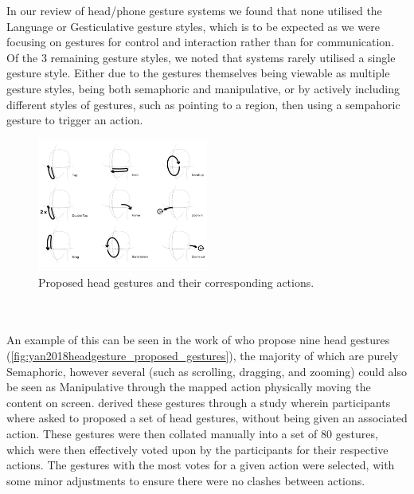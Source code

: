 In our review of head/phone gesture systems we found that none utilised the Language or Gesticulative gesture styles, which is to be expected as we were focusing on gestures for control and interaction rather than for communication.
Of the 3 remaining gesture styles, we noted that systems rarely utilised a single gesture style. Either due to the gestures themselves being viewable as multiple gesture styles, being both semaphoric and manipulative, or by actively including different styles of gestures, such as pointing to a region, then using a sempahoric gesture to trigger an action.
\begin{figure}
    \centering
    \includegraphics[width=0.5\textwidth]{figures/yan2018headgesture_fig2_proposed_gestures.png}
    \caption{\label{fig:yan2018headgesture_proposed_gestures} Proposed head gestures and their corresponding actions\cite{yan2018headgesture}.}
\end{figure}
\\\\
An example of this can be seen in the work of \citeauthor{yan2018headgesture}\cite{yan2018headgesture} who propose nine head gestures (\autoref{fig:yan2018headgesture_proposed_gestures}), the majority of which are purely Semaphoric, however several (such as scrolling, dragging, and zooming) could also be seen as Manipulative through the mapped action physically moving the content on screen.
\citeauthor{yan2018headgesture} derived these gestures through a study wherein participants where asked to proposed a set of head gestures, without being given an associated action. These gestures were then collated manually into a set of 80 gestures, which were then effectively voted upon by the participants for their respective actions.
The gestures with the most votes for a given action were selected, with some minor adjustments to ensure there were no clashes between actions.

